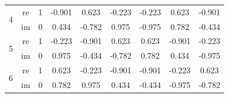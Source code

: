 \begin{center}
\begin{tabular}{| c c c c c c c c c |}
		\hline\hline
		\multirow{2}{*}{4}         & re                           & 1                            & -0.901                       & 0.623                        & -0.223                       & -0.223                       & 0.623                         & -0.901 \\
		                           & im                           & 0                            & 0.434                        & -0.782                       & 0.975                        & -0.975                       & 0.782                         & -0.434 \\
		\hline\hline
		\multirow{2}{*}{5}         & re                           & 1                            & -0.223                       & -0.901                       & 0.623                        & 0.623                        & -0.901                        & -0.223 \\
		                           & im                           & 0                            & 0.975                        & -0.434                       & -0.782                       & 0.782                        & 0.434                         & -0.975 \\
		\hline\hline
		\multirow{2}{*}{6}         & re                           & 1                            & 0.623                        & -0.223                       & -0.901                       & -0.901                       & -0.223                        & 0.623  \\
		                           & im                           & 0                            & 0.782                        & 0.975                        & 0.434                        & -0.434                       & -0.975                        & -0.782 \\
		\hline
	\end{tabular}
\end{center}

